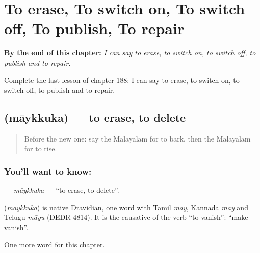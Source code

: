 
\chapter{To erase, To switch on, To switch off, To publish, To repair}
\label{ch:ml-to-erase-to-switch-on-to-switch-off-to-publish-to-repair}

\begin{chapteropening}
\textbf{By the end of this chapter:} \emph{I can say to erase, to switch on, to switch off, to publish and to repair.}

Complete the last lesson of chapter 188: I can say to erase, to switch on, to switch off, to publish and to repair.
\end{chapteropening}

\section[\texorpdfstring{\ml{മായ്ക്കുക} (māykkuka)}{മായ്ക്കുക (māykkuka)}]{ (māykkuka) — to erase, to delete}

\label{lesson:ML-C188-maykkuka}



\begin{quote}
Before the new one: say the Malayalam for to bark, then the Malayalam for to rise.
\end{quote}

\subsection*{You'll want to know: }
\textbf{} — \emph{māykkuka} — \textquotedblleft{}to erase, to delete\textquotedblright{}.

\begin{cousinweb}
\textbf{} (\emph{māykkuka}) is native Dravidian, one word with Tamil \emph{māy}, Kannada \emph{māy} and Telugu \emph{māyu} (DEDR 4814). It is the causative of the verb \textquotedblleft{}to vanish\textquotedblright{}: \textquotedblleft{}make vanish\textquotedblright{}.
\end{cousinweb}

\begin{grammarlens}[title={What you've built}]
One more word for this chapter.
\end{grammarlens}

